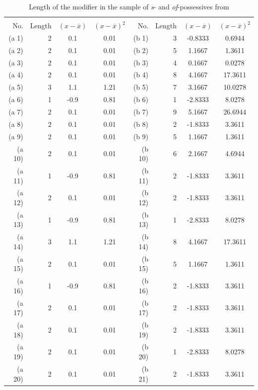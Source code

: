 \begin{table}
\caption{Length of the modifier in the sample of \textit{s}- and \textit{of}-possessives from }
\label{tab:posslengthwelch}
\begin{tabular}[t]{rrS[table-format=-1.1]crrS[table-format=-1.4]S[table-format=2.4]}
\lsptoprule
{} &   \\\cmidrule(lr){1-4}\cmidrule(lr){5-8}
      {No.}
	& {Length}
	& {$(x-\overline{x})$}
	& {$(x-\overline{x})^2$}
	& {No.}
	& {Length}
	& {$(x-\overline{x})$}
	& {$(x-\overline{x})^2$}
\\
\midrule
(a 1) & 2 & 0.1 & 0.01 & (b 1) & 3 & -0.8333 & 0.6944 \\
(a 2) & 2 & 0.1 & 0.01 & (b 2) & 5 & 1.1667 & 1.3611 \\
(a 3) & 2 & 0.1 & 0.01 & (b 3) & 4 & 0.1667 & 0.0278 \\
(a 4) & 2 & 0.1 & 0.01 & (b 4) & 8 & 4.1667 & 17.3611 \\
(a 5) & 3 & 1.1 & 1.21 & (b 5) & 7 & 3.1667 & 10.0278 \\
(a 6) & 1 & -0.9 & 0.81 & (b 6) & 1 & -2.8333 & 8.0278 \\
(a 7) & 2 & 0.1 & 0.01 & (b 7) & 9 & 5.1667 & 26.6944 \\
(a 8) & 2 & 0.1 & 0.01 & (b 8) & 2 & -1.8333 & 3.3611 \\
(a 9) & 2 & 0.1 & 0.01 & (b 9) & 5 & 1.1667 & 1.3611 \\
(a 10) & 2 & 0.1 & 0.01  &(b 10) & 6 & 2.1667 & 4.6944 \\
(a 11) & 1 & -0.9 & 0.81 & (b 11) & 2 & -1.8333 & 3.3611 \\
(a 12) & 2 & 0.1 & 0.01  &(b 12) & 2 & -1.8333 & 3.3611 \\
(a 13) & 1 & -0.9 & 0.81 & (b 13) & 1 & -2.8333 & 8.0278 \\
(a 14) & 3 & 1.1 & 1.21 & (b 14) & 8 & 4.1667 & 17.3611 \\
(a 15) & 2 & 0.1 & 0.01 & (b 15) & 5 & 1.1667 & 1.3611 \\
(a 16) & 1 & -0.9 & 0.81 & (b 16) & 2 & -1.8333 & 3.3611 \\
(a 17) & 2 & 0.1 & 0.01 & (b 17) & 2 & -1.8333 & 3.3611 \\
(a 18) & 2 & 0.1 & 0.01 & (b 19) & 2 & -1.8333 & 3.3611 \\
(a 19) & 2 & 0.1 & 0.01 & (b 20) & 1 & -2.8333 & 8.0278 \\
(a 20) & 2 & 0.1 & 0.01 & (b 21) & 2 & -1.8333 & 3.3611 \\

\end{tabular}
\end{table}
